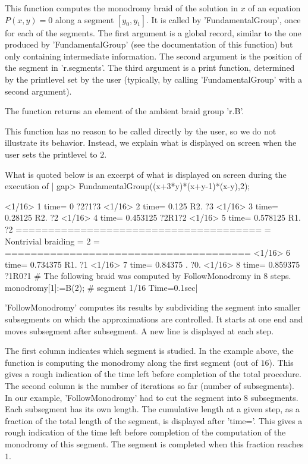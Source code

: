 This function computes the monodromy braid  of the solution in $x$ of an
equation  $P(x,y)=0$  along  a  segment $[y_0,y_1]$.  It  is  called  by
'FundamentalGroup', once for each of the segments. The first argument is
a global record, similar to  the one produced by 'FundamentalGroup' (see
the  documentation of  this function)  but only  containing intermediate
information.  The second  argument is  the  position of  the segment  in
'r.segments'. The third argument is  a print function, determined by the
printlevel  set by  the user  (typically, by  calling 'FundamentalGroup'
with a second argument).

The function returns an element of the ambient braid group 'r.B'.

This function has no reason to be  called directly by the user, so we do
not illustrate its  behavior. Instead, we explain what  is displayed on
screen when the user sets the printlevel to $2$.

What is quoted below is an excerpt of what is displayed on screen
during the execution of
|    gap>  FundamentalGroup((x+3*y)*(x+y-1)*(x-y),2);

    <1/16>    1 time=          0   ?2?1?3
    <1/16>    2 time=      0.125   R2. ?3
    <1/16>    3 time=    0.28125   R2. ?2
    <1/16>    4 time=   0.453125   ?2R1?2
    <1/16>    5 time=   0.578125   R1. ?2
    ======================================
    =    Nontrivial braiding = 2         =
    ======================================
    <1/16>    6 time=   0.734375   R1. ?1
    <1/16>    7 time=    0.84375   . ?0. 
    <1/16>    8 time=   0.859375   ?1R0?1
    # The following braid was computed by FollowMonodromy in 8 steps.
    monodromy[1]:=B(2);
    # segment 1/16 Time=0.1sec|

'FollowMonodromy' computes  its results by subdividing  the segment into
smaller  subsegments  on which  the  approximations  are controlled.  It
starts at one  end and moves subsegment after subsegment.  A new line is
displayed at each step.

The  first column  indicates which  segment is  studied. In  the example
above, the function  is computing the monodromy along  the first segment
(out  of  $16$).  This  gives  a  rough  indication  of  the  time  left
before  completion of  the total  procedure.  The second  column is  the
number of  iterations so  far (number of  subsegments). In  our example,
'FollowMonodromy'  had to  cut the  segment into  $8$ subsegments.  Each
subsegment has its own length. The cumulative length at a given step, as
a  fraction of  the  total length  of the  segment,  is displayed  after
'time='.  This  gives  a  rough  indication  of  the  time  left  before
completion  of the  computation of  the monodromy  of this  segment. The
segment is completed when this fraction reaches $1$.


